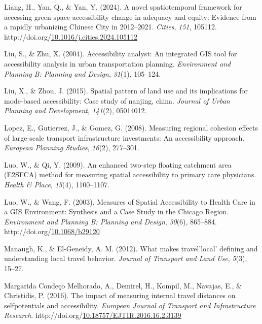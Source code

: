 \documentclass[
11pt, %
oneside, %
english, %
singlespacing, %
]{macthesis} %
\newlength{\cslhangindent}
\newenvironment{CSLReferences}[2] %
{\begin{list}{}{%
	\setlength{\itemindent}{0pt}
	\setlength{\leftmargin}{0pt}
	\setlength{\parsep}{0pt}
	\ifodd #1
	\setlength{\leftmargin}{\cslhangindent}
	\setlength{\itemindent}{-1\cslhangindent}
	\fi
	\setlength{\itemsep}{#2\baselineskip}}}
{\end{list}}
\begin{document}
\begin{CSLReferences}{1}{0}
Liang, H., Yan, Q., \& Yan, Y. (2024). A novel spatiotemporal framework for accessing green space accessibility change in adequacy and equity: {Evidence} from a rapidly urbanizing {Chinese} {City} in 2012--2021. \emph{Cities}, \emph{151}, 105112. http://doi.org/\href{https://doi.org/10.1016/j.cities.2024.105112}{10.1016/j.cities.2024.105112}

Liu, S., \& Zhu, X. (2004). Accessibility analyst: An integrated GIS tool for accessibility analysis in urban transportation planning. \emph{Environment and Planning B: Planning and Design}, \emph{31}(1), 105--124.

Liu, X., \& Zhou, J. (2015). Spatial pattern of land use and its implications for mode-based accessibility: Case study of nanjing, china. \emph{Journal of Urban Planning and Development}, \emph{141}(2), 05014012.

Lopez, E., Gutierrez, J., \& Gomez, G. (2008). Measuring regional cohesion effects of large-scale transport infrastructure investments: {An} accessibility approach. \emph{European Planning Studies}, \emph{16}(2), 277--301.

Luo, W., \& Qi, Y. (2009). An enhanced two-step floating catchment area ({E2SFCA}) method for measuring spatial accessibility to primary care physicians. \emph{Health \& Place}, \emph{15}(4), 1100--1107.

Luo, W., \& Wang, F. (2003). Measures of Spatial Accessibility to Health Care in a GIS Environment: Synthesis and a Case Study in the Chicago Region. \emph{Environment and Planning B: Planning and Design}, \emph{30}(6), 865--884. http://doi.org/\href{https://doi.org/10.1068/b29120}{10.1068/b29120}

Manaugh, K., \& El-Geneidy, A. M. (2012). What makes travel'local' defining and understanding local travel behavior. \emph{Journal of Transport and Land Use}, \emph{5}(3), 15--27.

Margarida Condeço Melhorado, A., Demirel, H., Kompil, M., Navajas, E., \& Christidis, P. (2016). The impact of measuring internal travel distances on selfpotentials and accessibility. \emph{European Journal of Transport and Infrastructure Research}. http://doi.org/\href{https://doi.org/10.18757/EJTIR.2016.16.2.3139}{10.18757/EJTIR.2016.16.2.3139}


\end{CSLReferences}
\end{document}
